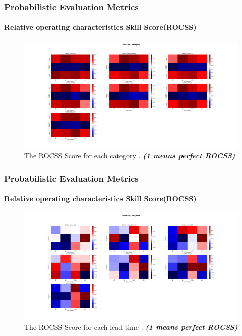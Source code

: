 \begin{frame}
\frametitle{Probabilistic Evaluation Metrics}
\framesubtitle{Relative operating characteristics Skill Score(ROCSS)}

\begin{figure}[H]
    \centering
    \includegraphics[scale=0.15]{rocss_RR_category.png}
    \caption{The ROCSS Score for each category  . \textbf{\textit{(1 means perfect ROCSS)}}}
\end{figure}
\end{frame}

\begin{frame}
\frametitle{Probabilistic Evaluation Metrics}
\framesubtitle{Relative operating characteristics Skill Score(ROCSS)}

\begin{figure}[H]
    \centering
    \includegraphics[scale=0.15]{rocss_RR_lead_time.png}
    \caption{The ROCSS Score for each lead time  . \textbf{\textit{(1 means perfect ROCSS)}}}
\end{figure}
\end{frame}